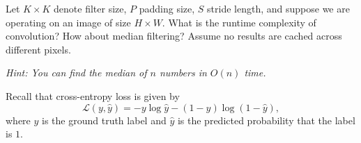 \documentclass[11pt]{article}
\begin{document}
\begin{subparts}
        
    \subpart Let $K \times K$ denote filter size, $P$ padding size, $S$ stride length, and suppose we are operating on an image of size $H \times W$. What is the runtime complexity of convolution? How about median filtering? Assume no results are cached across different pixels.

    \emph{Hint: You can find the median of $n$ numbers in $O(n)$ time.}


\end{subparts}

\newpage

	Recall that cross-entropy loss is given by
    $$
    \mathcal{L}(y, \hat{y}) = - y \log \hat{y} - (1 - y) \log (1 - \hat{y}),
    $$
    where $y$ is the ground truth label and $\hat{y}$ is the predicted probability that the label is $1$.
\end{document}
